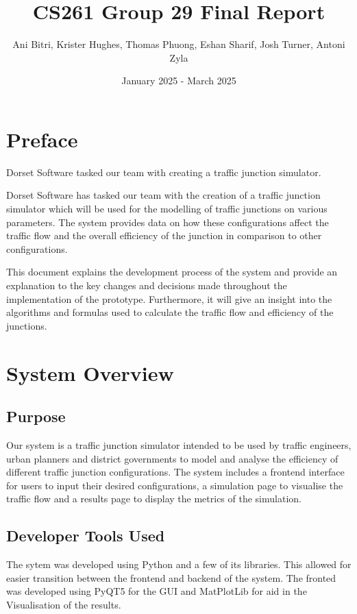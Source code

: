 \documentclass{article}
\title{\vspace{-1.5cm}CS261 Group 29 Final Report}
\author{Ani Bitri, Krister Hughes, Thomas Phuong, Eshan Sharif, Josh Turner, Antoni Zyla}
\date{January 2025 - March 2025}
\begin{document}
    \maketitle

    \tableofcontents

    \section{Preface}

    Dorset Software tasked our team with creating a traffic junction simulator.

    Dorset Software has tasked our team with the creation of a traffic junction simulator which will be used for the modelling of traffic junctions on various parameters. The system provides data on how these configurations
    affect the traffic flow and the overall efficiency of the junction in comparison to other configurations.

    This document explains the development process of the system and provide an explanation to the key changes and decisions made throughout the implementation of the prototype. Furthermore,
    it will give an insight into the algorithms and formulas used to calculate the traffic flow and efficiency of the junctions.


    \section{System Overview}

    \subsection{Purpose}

    Our system is a traffic junction simulator intended to be used by traffic engineers, urban planners and district governments to model and analyse the efficiency of different traffic junction configurations. The
    system includes a frontend interface for users to input their desired configurations, a simulation page to visualise the traffic flow and a results page to display the metrics of the simulation.

    \subsection{Developer Tools Used}

    The sytem was developed using Python and a few of its libraries. This allowed for easier transition between the frontend and backend of the system. The
    fronted was developed using PyQT5 for the GUI and MatPlotLib for aid in the Visualisation of the results.
\end{document}
